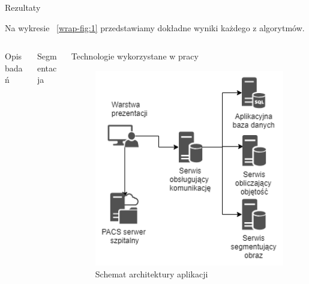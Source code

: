 \documentclass[final]{beamer}
\newlength{\onecolwid}
\newlength{\threecolwid}
\begin{document}
\begin{frame}[t]
\begin{columns}[t]
\begin{column}{\threecolwid}
\begin{block}{Rezultaty}
        \par
Na wykresie ~\ref{wrap-fig:1} przedstawiamy dokładne wyniki każdego z algorytmów.
      \end{block}
      \begin{columns}[t,totalwidth=\threecolwid]	%
        \begin{column}{\onecolwid}
          \begin{block}{Opis badań}
          
          \end{block}
        \end{column}
        \begin{column}{\onecolwid}
  			\begin{block}{Segmentacja}

  			\end{block}       
        \end{column}
        \begin{column}{\onecolwid}
          \begin{block}{Technologie wykorzystane w pracy}
			\begin{figure}
				\caption{Schemat architektury aplikacji}
				\includegraphics[width=20cm]{Architektura.png}
			\end{figure}

\end{block}
\end{column}
\end{columns}
\end{column}
\end{columns}
\end{frame}
\end{document}
